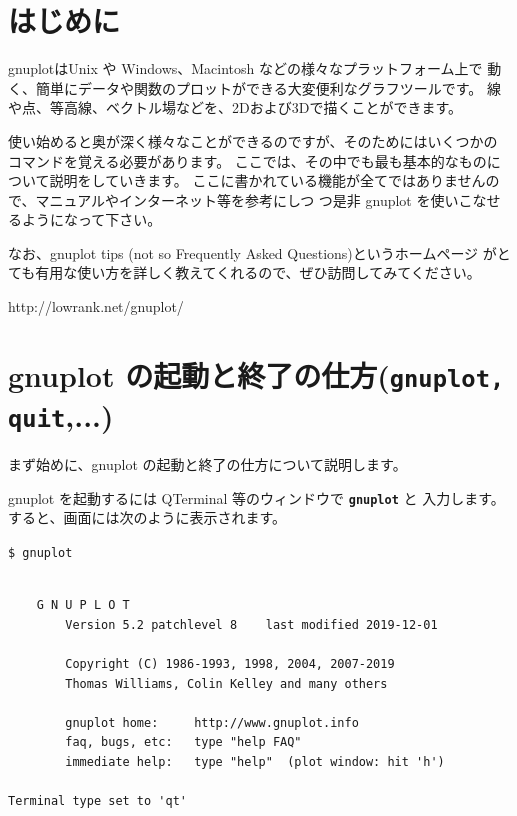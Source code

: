 \documentclass[a4j]{ujarticle} %
\begin{document}
\newpage
\setcounter{section}{-1}

\section{はじめに}
gnuplotはUnix や Windows、Macintosh などの様々なプラットフォーム上で
動く、簡単にデータや関数のプロットができる大変便利なグラフツールです。
線や点、等高線、ベクトル場などを、2Dおよび3Dで描くことができます。

使い始めると奥が深く様々なことができるのですが、そのためにはいくつかの
コマンドを覚える必要があります。
ここでは、その中でも最も基本的なものについて説明をしていきます。
ここに書かれている機能が全てではありませんので、マニュアルやインターネット等を参考にしつ
つ是非 gnuplot を使いこなせるようになって下さい。

なお、gnuplot tips (not so Frequently Asked Questions)というホームページ
がとても有用な使い方を詳しく教えてくれるので、ぜひ訪問してみてください。\\
\begin{center}
http://lowrank.net/gnuplot/
\end{center}

\section{gnuplot の起動と終了の仕方({\tt\bf gnuplot, quit},...)}
まず始めに、gnuplot の起動と終了の仕方について説明します。

gnuplot を起動するには QTerminal 等のウィンドウで {\tt\bf gnuplot} と
入力します。すると、画面には次のように表示されます。\\
\begin{framed}
 \begin{minipage}{0.95\textwidth}
  \texttt{\$ gnuplot}
  {\small
  \begin{verbatim}
  
  	G N U P L O T
        Version 5.2 patchlevel 8    last modified 2019-12-01 

        Copyright (C) 1986-1993, 1998, 2004, 2007-2019
        Thomas Williams, Colin Kelley and many others

        gnuplot home:     http://www.gnuplot.info
        faq, bugs, etc:   type "help FAQ"
        immediate help:   type "help"  (plot window: hit 'h')

Terminal type set to 'qt'
  \end{verbatim}
  }
 \end{minipage}
\end{framed}
\end{document}
